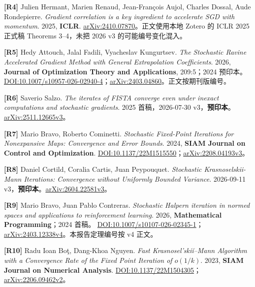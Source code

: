 \documentclass[
  chinese,
  10pt,
  a4paper,
]{article}
\begin{document}
\textbf{{[}R4{]}} Julien Hermant, Marien Renaud, Jean-François Aujol,
Charles Dossal, Aude Rondepierre. \emph{Gradient correlation is a key
ingredient to accelerate SGD with momentum}. 2025, \textbf{ICLR}.
\href{https://arxiv.org/abs/2410.07870}{arXiv:2410.07870}。正文使用本地
Zotero 的 ICLR 2025 正式稿 Theorems 3--4，未把 2026 v3
的可能编号变化混入。

\textbf{{[}R5{]}} Hedy Attouch, Jalal Fadili, Vyacheslav Kungurtsev.
\emph{The Stochastic Ravine Accelerated Gradient Method with General
Extrapolation Coefficients}. 2026, \textbf{Journal of Optimization
Theory and Applications}, 209:5；2024 预印本。
\href{https://doi.org/10.1007/s10957-026-02940-4}{DOI:10.1007/s10957-026-02940-4}；\href{https://arxiv.org/abs/2403.04860}{arXiv:2403.04860}。正文按期刊版编号。

\textbf{{[}R6{]}} Saverio Salzo. \emph{The iterates of FISTA converge
even under inexact computations and stochastic gradients}. 2025
首稿，2026-07-30
v3，\textbf{预印本}。\href{https://arxiv.org/abs/2511.12665v3}{arXiv:2511.12665v3}。

\textbf{{[}R7{]}} Mario Bravo, Roberto Cominetti. \emph{Stochastic
Fixed-Point Iterations for Nonexpansive Maps: Convergence and Error
Bounds}. 2024, \textbf{SIAM Journal on Control and Optimization}.
\href{https://doi.org/10.1137/22M1515550}{DOI:10.1137/22M1515550}；\href{https://arxiv.org/abs/2208.04193v3}{arXiv:2208.04193v3}。

\textbf{{[}R8{]}} Daniel Cortild, Coralia Cartis, Juan Peypouquet.
\emph{Stochastic Krasnoselskii-Mann Iterations: Convergence without
Uniformly Bounded Variance}. 2026-09-11
v3，\textbf{预印本}。\href{https://arxiv.org/abs/2604.22581v3}{arXiv:2604.22581v3}。

\textbf{{[}R9{]}} Mario Bravo, Juan Pablo Contreras. \emph{Stochastic
Halpern iteration in normed spaces and applications to reinforcement
learning}. 2026, \textbf{Mathematical Programming}；2024 首稿。
\href{https://doi.org/10.1007/s10107-026-02345-1}{DOI:10.1007/s10107-026-02345-1}；\href{https://arxiv.org/abs/2403.12338v4}{arXiv:2403.12338v4}。本报告定理编号按
v4 正文。

\textbf{{[}R10{]}} Radu Ioan Boţ, Dang-Khoa Nguyen. \emph{Fast
Krasnosel'skiĭ--Mann Algorithm with a Convergence Rate of the Fixed
Point Iteration of \(o(1/k)\)}. 2023, \textbf{SIAM Journal on Numerical
Analysis}.
\href{https://doi.org/10.1137/22M1504305}{DOI:10.1137/22M1504305}；\href{https://arxiv.org/abs/2206.09462v2}{arXiv:2206.09462v2}。
\end{document}
